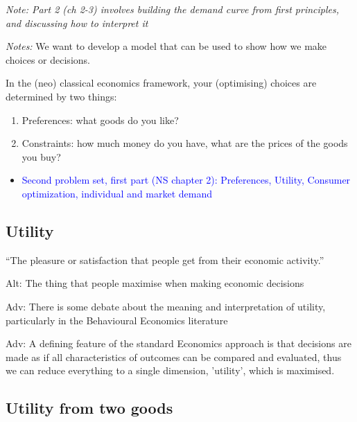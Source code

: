 \documentclass[]{article}
\providecommand{\tightlist}{%
  \setlength{\itemsep}{0pt}\setlength{\parskip}{0pt}}
\begin{document}
\emph{Note: Part 2 (ch 2-3) involves building the demand curve from
first principles, and discussing how to interpret it}

\emph{Notes:} We want to develop a model that can be used to show how we
make choices or decisions.

In the (neo) classical economics framework, your (optimising) choices
are determined by two things:

\begin{enumerate}
\def\labelenumi{\arabic{enumi}.}
\item
  Preferences: what goods do you like?
\item
  Constraints: how much money do you have, what are the prices of the
  goods you buy?
\end{enumerate}

\begin{itemize}
\tightlist
\item
  \textcolor{blue}{Second problem set, first part (NS chapter 2): Preferences, Utility, Consumer optimization, individual and market demand}
\end{itemize}

\hypertarget{utility}{%
\subsection{Utility}\label{utility}}

\begin{description}
\tightlist
\item[Utility]
``The pleasure or satisfaction that people get from their economic
activity.''

Alt: The thing that people maximise when making economic decisions
\end{description}

\textcolor{RawSienna}{Adv: There is some debate about the meaning and interpretation of utility, particularly in the Behavioural Economics literature }

\textcolor{RawSienna}{Adv: A defining feature of the standard Economics approach is that decisions are made as if all characteristics of outcomes can be compared and evaluated, thus we can reduce everything to a single dimension, 'utility', which is maximised.}

\hypertarget{utility-from-two-goods}{%
\subsection{Utility from two goods}\label{utility-from-two-goods}}
\end{document}
